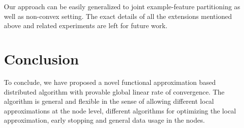 Our approach can be easily generalized to joint example-feature partitioning as well as non-convex setting. The exact details of all the extensions mentioned above and related experiments are left for future work.

\section{Conclusion}
To conclude, we have proposed a novel functional approximation based distributed algorithm with provable global linear rate of convergence. The algorithm is general and flexible in the 
sense of allowing different local approximations at the node level, different algorithms for optimizing the local approximation, early stopping and general data usage in the nodes.
